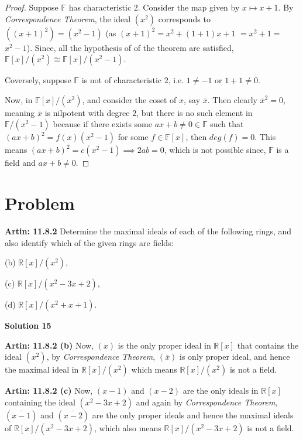 \documentclass[12pt,a4paper]{article}
\theoremstyle{definition}
\begin{document}
\begin{flushleft}
\begin{proof}
	Suppose $\mathbb{F}$ has characteristic $2$. Consider the map given by $x \mapsto x+1$. By {\it Correspondence Theorem}, the ideal $(x^2)$ corresponds to $((x+1)^2) = (x^2 - 1)$ (as $(x+1)^2 = x^2 + (1+1)x + 1$ $ = x^2 +1 = $ $ x^2 -1$). Since, all the hypothesis of of the theorem are satisfied, $\mathbb{F}[x]/(x^2) \cong \mathbb{F}[x]/(x^2-1)$.

	\medskip

	Coversely, suppose $\mathbb{F}$ is not of characteristic $2$, i.e. $1 \ne -1$ or $1 + 1 \ne 0$.

	Now, in $\mathbb{F}[x]/(x^2)$, and consider the coset of $x$, say $\overline{x}$. Then clearly $\overline{x}^2 = 0$, meaning $\overline{x}$ is nilpotent with degree $2$, but there is no such element in $\mathbb{F}/(x^2-1)$ because if there exists some $ax+b \ne 0 \in \mathbb{F}$ such that $(ax+b)^2 = f(x)(x^2-1)$ for some $f \in \mathbb{F}[x]$, then $deg(f) = 0$. This means $(ax + b)^2 = c(x^2 -1) \implies 2ab = 0$, which is not possible since, $\mathbb{F}$ is a field and $ax + b \ne 0$.
\end{proof}

\newpage

\setcounter{section}{14}
\section{Problem}

{\bf Artin: 11.8.2} Determine the maximal ideals of each of the following rings, and also identify which of the given rings are fields:

(b) $\mathbb{R}[x]/(x^2)$,

(c) $\mathbb{R}[x]/(x^2-3x+2)$,

(d) $\mathbb{R}[x]/(x^2+x+1)$.

\bigskip

{\bf Solution 15} 

\medskip

{\bf Artin: 11.8.2 (b)} Now, $(x)$ is the only proper ideal in $\mathbb{R}[x]$ that contains the ideal $(x^2)$, by {\it Correspondence Theorem}, $(\overline{x})$ is only proper ideal, and hence the maximal ideal in $\mathbb{R}[x]/(x^2)$ which means $\mathbb{R}[x]/(x^2)$ is not a field.

\medskip

{\bf Artin: 11.8.2 (c)} Now, $(x-1)$ and $(x-2)$ are the only ideals in $\mathbb{R}[x]$ containing the ideal $(x^2-3x+2)$ and again by {\it Correspondence Theorem}, $(\overline{x-1})$ and $(\overline{x-2})$ are the only proper ideals and hence the maximal ideals of $\mathbb{R}[x]/(x^2 - 3x +2)$, which also means $\mathbb{R}[x]/(x^2 - 3x +2)$ is not a field.


\end{flushleft}
\end{document}
